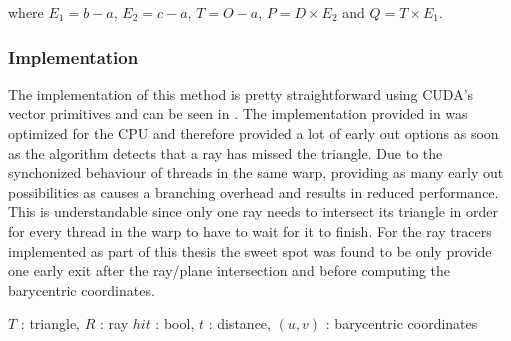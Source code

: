 where $E_1 = b - a$, $E_2 = c - a$, $T = O - a$, $P = D \times  E_2$
and $Q = T \times  E_1$.

\subsubsection{Implementation}

The implementation of this method is pretty straightforward using CUDA's vector
primitives and can be seen in . The implementation
provided in  was optimized for the CPU and therefore
provided a lot of early out options as soon as the algorithm detects that a ray
has missed the triangle. Due to the synchonized behaviour of threads in the same
warp, providing as many early out possibilities as 
causes a branching overhead and results in reduced performance. This is
understandable since only one ray needs to intersect its triangle in order for
every thread in the warp to have to wait for it to finish. For the ray tracers
implemented as part of this thesis the sweet spot was found to be only provide
one early exit after the ray/plane intersection and before computing the
barycentric coordinates.

\begin{algorithm}
  \caption{Möller-Trumbore ray/triangle intersection test}
  \label{alg:moellerTrumbore}
  \begin{algorithmic}
              {$T$ : triangle, $R$ : ray}
              {$hit$ : bool, $t$ : distance, $(u,v)$ : barycentric coordinates}
              {
                \ELSE
                \ENDIF
              }
  \end{algorithmic}
\end{algorithm}


